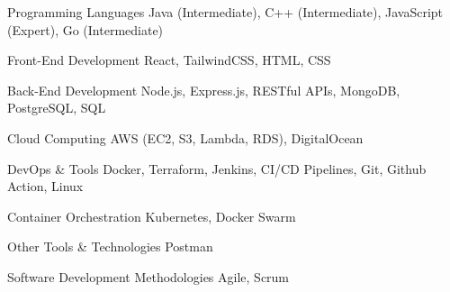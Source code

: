 
\begin{cvskills}

  \cvskill
    {Programming Languages} %
    {Java (Intermediate), C++ (Intermediate), JavaScript (Expert), Go (Intermediate)} %

  \cvskill
    {Front-End Development} %
    {React, TailwindCSS, HTML, CSS} %

  \cvskill
    {Back-End Development} %
    {Node.js, Express.js, RESTful APIs, MongoDB, PostgreSQL, SQL} %

  \cvskill
    {Cloud Computing} %
    {AWS (EC2, S3, Lambda, RDS), DigitalOcean} %

  \cvskill
    {DevOps & Tools} %
    {Docker, Terraform, Jenkins, CI/CD Pipelines, Git, Github Action, Linux} %

  \cvskill
    {Container Orchestration} %
    {Kubernetes, Docker Swarm} %

  \cvskill
    {Other Tools & Technologies} %
    {Postman} %

  \cvskill
    {Software Development Methodologies} %
    {Agile, Scrum} %

\end{cvskills}

